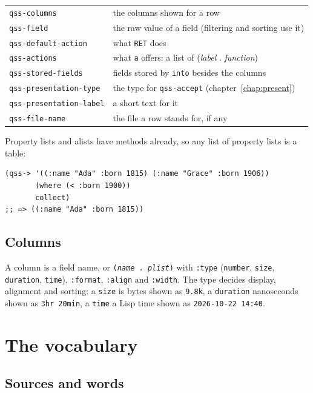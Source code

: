\documentclass[
  paper=a4, fontsize=11pt, parskip=half, headings=small,
  toc=bibliography, numbers=noenddot, DIV=12
]{scrreprt}
\newcommand{\code}[1]{\texttt{#1}}
\newcommand{\kbd}[1]{\texttt{#1}}
\begin{document}
\noindent\begin{tabularx}{\linewidth}{@{}lX@{}}
\toprule
\code{qss-columns} & the columns shown for a row \\
\code{qss-field} & the raw value of a field (filtering and sorting use it) \\
\code{qss-default-action} & what \kbd{RET} does \\
\code{qss-actions} & what \kbd{a} offers: a list of (\emph{label} . \emph{function}) \\
\code{qss-stored-fields} & fields stored by \code{into} besides the columns \\
\code{qss-presentation-type} & the type for \code{qss-accept} (chapter~\ref{chap:present}) \\
\code{qss-presentation-label} & a short text for it \\
\code{qss-file-name} & the file a row stands for, if any \\
\bottomrule
\end{tabularx}

Property lists and alists have methods already, so any list of property lists
is a table:

\begin{lstlisting}
(qss-> '((:name "Ada" :born 1815) (:name "Grace" :born 1906))
       (where (< :born 1900))
       collect)
;; => ((:name "Ada" :born 1815))
\end{lstlisting}

\section{Columns}

A column is a field name, or \code{(\emph{name} . \emph{plist})} with
\code{:type} (\code{number}, \code{size}, \code{duration}, \code{time}),
\code{:format}, \code{:align} and \code{:width}. The type decides display,
alignment and sorting: a \code{size} is bytes shown as \code{9.8k}, a
\code{duration} nanoseconds shown as \code{3hr 20min}, a \code{time} a Lisp time
shown as \code{2026-10-22 14:40}.

\chapter{The vocabulary}

\section{Sources and words}
\end{document}
